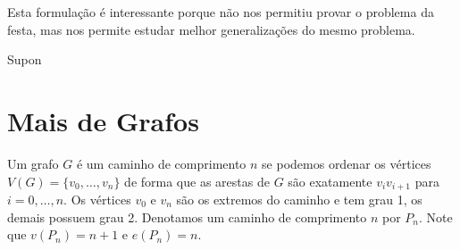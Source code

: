 Esta formulação é interessante porque não nos permitiu provar o problema da festa, mas nos permite estudar melhor generalizações do mesmo problema.

Supon

\section{Mais de Grafos}



\begin{example}[Caminhos]
Um grafo $G$ é um caminho de comprimento $n$ se podemos ordenar os vértices $V(G) = \{ v_0, \dots, v_n\}$ de forma que as arestas de $G$ são exatamente $v_iv_{i+1}$ para $i = 0,\dots, n$. Os vértices $v_0$ e $v_n$ são os extremos do caminho e tem grau 1, os demais possuem grau 2. Denotamos um caminho de comprimento $n$ por $P_n$. Note que $v(P_n) = n+1$ e $e(P_n) = n$.
\end{example}







